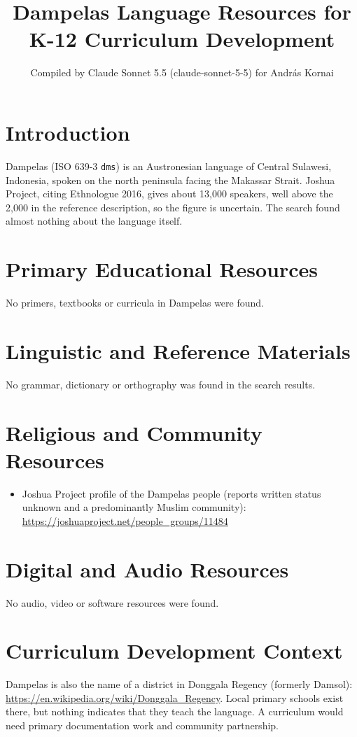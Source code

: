 \documentclass[12pt]{article}
\title{Dampelas Language Resources for K-12 Curriculum Development}
\author{Compiled by Claude Sonnet 5.5 (claude-sonnet-5-5) for Andr\'as Kornai}
\date{}
\begin{document}
\maketitle

\section{Introduction}
Dampelas (ISO 639-3 \texttt{dms}) is an Austronesian language of Central Sulawesi, Indonesia, spoken on the north peninsula facing the Makassar Strait. Joshua Project, citing Ethnologue 2016, gives about 13,000 speakers, well above the 2,000 in the reference description, so the figure is uncertain. The search found almost nothing about the language itself.

\section{Primary Educational Resources}
No primers, textbooks or curricula in Dampelas were found.

\section{Linguistic and Reference Materials}
No grammar, dictionary or orthography was found in the search results.

\section{Religious and Community Resources}
\begin{itemize}
\item Joshua Project profile of the Dampelas people (reports written status unknown and a predominantly Muslim community): \url{https://joshuaproject.net/people_groups/11484}
\end{itemize}

\section{Digital and Audio Resources}
No audio, video or software resources were found.

\section{Curriculum Development Context}
Dampelas is also the name of a district in Donggala Regency (formerly Damsol): \url{https://en.wikipedia.org/wiki/Donggala_Regency}. Local primary schools exist there, but nothing indicates that they teach the language. A curriculum would need primary documentation work and community partnership.
\end{document}
